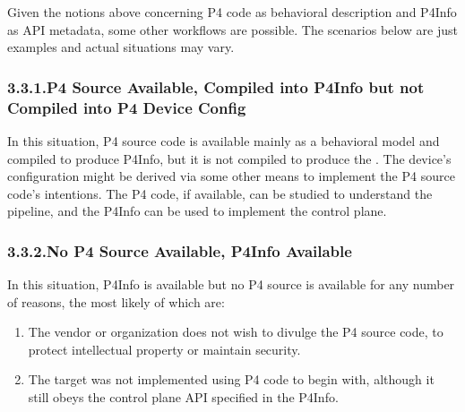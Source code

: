 \documentclass[11pt]{article}
\begin{document}
{%
\noindent{}Given the notions above concerning P4 code as behavioral description and P4Info
as API metadata, some other workflows are possible. The scenarios below are just
examples and actual situations may vary.%

\subsubsection{3.3.1.\hspace*{0.5em}P4 Source Available, Compiled into P4Info but not Compiled into P4 Device Config}\label{sec-p4-source-available-compiled-into-p4info-but-not-compiled-into-p4-device-config}%

\noindent{}In this situation, P4 source code is available mainly as a behavioral model and
compiled to produce P4Info, but it is not compiled to produce the
. The device's configuration might be derived via some other
means to implement the P4 source code's intentions. The P4 code, if available,
can be studied to understand the pipeline, and the P4Info can be used to
implement the control plane.%

\subsubsection{3.3.2.\hspace*{0.5em}No P4 Source Available, P4Info Available}\label{sec-no-p4-source-available-p4info-available}%

\noindent{}In this situation, P4Info is available but no P4 source is available for any
number of reasons, the most likely of which are:%

\begin{enumerate}%

\item{}
The vendor or organization does not wish to divulge the P4 source code, to
protect intellectual property or maintain security.%

\item{}
The target was not implemented using P4 code to begin with, although it still
obeys the control plane API specified in the P4Info.%
\end{enumerate}%

}
\end{document}

